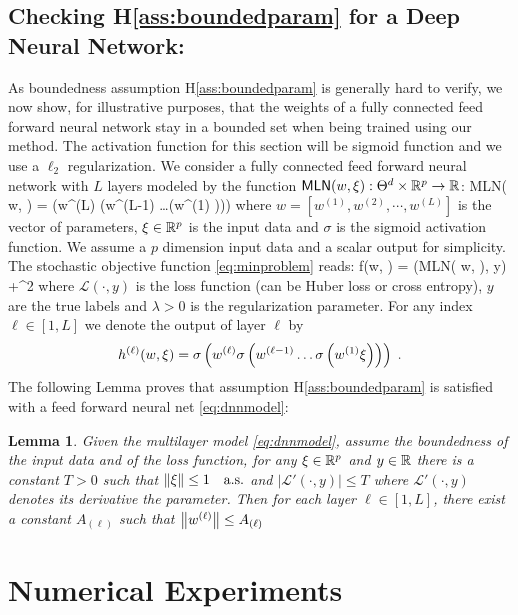 \documentclass[11pt]{article}
\newtheorem{Lemma}{Lemma}
\theoremstyle{k}
\begin{document}
\subsection{Checking H\ref{ass:boundedparam} for a Deep Neural Network:}
As boundedness assumption H\ref{ass:boundedparam} is generally hard to verify, we now show, for illustrative purposes, that the weights of a fully connected feed forward neural network stay in a bounded set when being trained using our method. 
The activation function for this section will be sigmoid function and we use a $\ell_2$ regularization. 
We consider a fully connected feed forward neural network with $L$ layers modeled by the function $\textsf{MLN}(w, \xi): \Theta^d \times \mathbb{R}^p \to \mathbb{R}$:
\beq\label{eq:dnnmodel}
\textsf{MLN}( w, \xi) = \sigma\left(w^{(L)} \sigma\left(w^{(L-1)} \ldots \sigma\left(w^{(1)} \xi \right)\right)\right)
\eeq
where $w = [w^{(1)}, w^{(2)}, \cdots , w^{(L)}]$ is the vector of parameters, $\xi \in \mathbb{R}^p$ is the input data and $\sigma$ is the sigmoid activation function. We assume a $p$ dimension input data and a scalar output for simplicity.
The stochastic objective function \eqref{eq:minproblem} reads:
\beq \notag
f(w, \xi) = (\textsf{MLN}( w, \xi), y) +^2
\eeq
where $\mathcal{L}(\cdot, y)$ is the loss function (can be Huber loss or cross entropy), $y$ are the true labels and $\lambda >0$ is the regularization parameter.
For any index $\ell \in [1, L]$ we denote the output of layer $\ell$ by 
$$
h^{(\ell)}(w,\xi)= \sigma\left(w^{(\ell)} \sigma\left(w^{(\ell-1)} \ldots \sigma\left(w^{(1)} \xi \right)\right)\right) \;.
$$
The following Lemma proves that assumption H\ref{ass:boundedparam} is satisfied with a feed forward neural net \eqref{eq:dnnmodel}:
\begin{Lemma}\label{lem:dnnh2} 
Given the multilayer model \eqref{eq:dnnmodel}, assume the boundedness of the input data and of the loss function, \ie for any $\xi \in \mathbb{R}^p$ and $y \in \mathbb{R}$ there is a constant $T >0$ such that $\left\Vert \xi \right\Vert \leq 1 \quad \textrm{a.s.}$ and $|\mathcal{L}'(\cdot, y)| \leq T$ where $\mathcal{L}'(\cdot, y)$ denotes its derivative \wrt the parameter. Then for each layer $\ell \in [1,L]$, there exist a constant $A_{(\ell)}$ such that $\left\Vert w^{(\ell)} \right\Vert \leq A_{(\ell)}$
\end{Lemma}
\section{Numerical Experiments}\label{sec:numerical}
\end{document}
